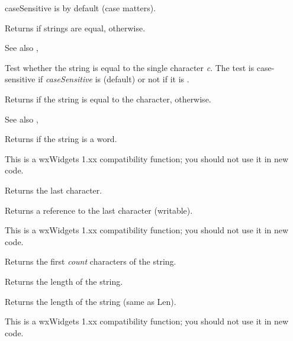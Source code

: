 caseSensitive is \true by default (case matters).

Returns \true if strings are equal, \false otherwise.

See also , 


Test whether the string is equal to the single character {\it c}. The test is
case-sensitive if {\it caseSensitive} is \true (default) or not if it is \false.

Returns \true if the string is equal to the character, \false otherwise.

See also , 


\label{wxstringisword}


Returns \true if the string is a word.

This is a wxWidgets 1.xx compatibility function; you should not use it in new code.


\label{wxstringlast}


Returns the last character.


Returns a reference to the last character (writable).

This is a wxWidgets 1.xx compatibility function; you should not use it in new code.


\label{wxstringleft}


Returns the first {\it count} characters of the string.


\label{wxstringlen}


Returns the length of the string.


\label{wxstringlength}


Returns the length of the string (same as Len).

This is a wxWidgets 1.xx compatibility function; you should not use it in new code.


